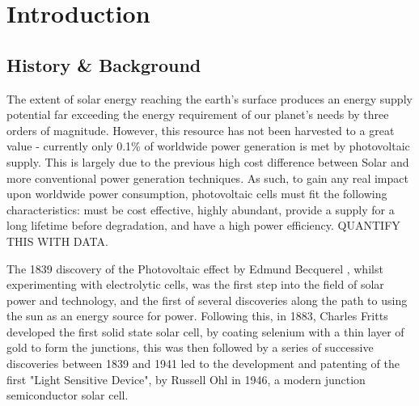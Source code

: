 
\chapter{Introduction} %

\label{Chapter1} %



\section{History \& Background}

The extent of solar energy reaching the earth's surface produces an energy supply potential far exceeding the energy requirement of our planet's needs by three orders of magnitude.\citep{Morton2006} However, this resource has not been harvested to a great value - currently only 0.1\% of worldwide power generation is met by photovoltaic supply. \citep{Mitzi2011} This is largely due to the previous high cost difference between Solar and more conventional power generation techniques. As such, to gain any real impact upon worldwide power consumption, photovoltaic cells must fit the following characteristics: must be cost effective, highly abundant, provide a supply for a long lifetime before degradation, and have a high power efficiency. QUANTIFY THIS WITH DATA.


The 1839 discovery of the Photovoltaic effect by Edmund Becquerel \citep{Nelson2003}, whilst experimenting with electrolytic cells, was the first step into the field of solar power and technology, and the first of several discoveries along the path to using the sun as an energy source for power. Following this, in 1883, Charles Fritts \citep{Fritts1883} developed the first solid state solar cell, by coating selenium with a thin layer of gold to form the junctions, this was then followed by a series of successive discoveries between 1839 and 1941 led to the development and patenting of the first "Light Sensitive Device", by Russell Ohl in 1946, a modern junction semiconductor solar cell. \citep{Green2009a} 

